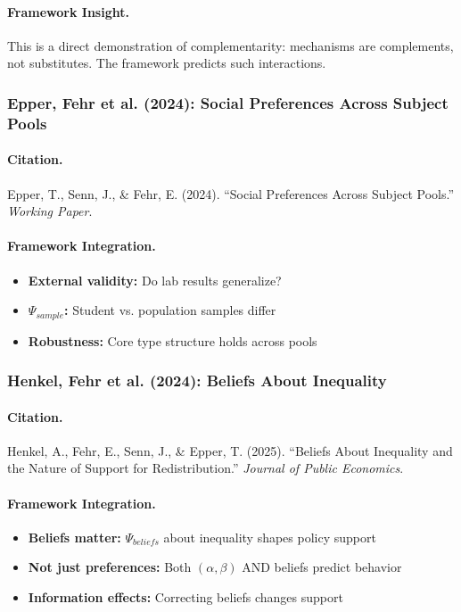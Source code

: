 \paragraph{Framework Insight.}
This is a direct demonstration of complementarity: mechanisms are
complements, not substitutes. The framework predicts such interactions.

\subsubsection{Epper, Fehr et al. (2024): Social Preferences Across Subject Pools}

\paragraph{Citation.}
Epper, T., Senn, J., \& Fehr, E. (2024). ``Social Preferences Across Subject Pools.''
\emph{Working Paper}.

\paragraph{Framework Integration.}
\begin{itemize}
  \item \textbf{External validity:} Do lab results generalize?
  \item \textbf{$\Psi_{sample}$:} Student vs. population samples differ
  \item \textbf{Robustness:} Core type structure holds across pools
\end{itemize}

\subsubsection{Henkel, Fehr et al. (2024): Beliefs About Inequality}

\paragraph{Citation.}
Henkel, A., Fehr, E., Senn, J., \& Epper, T. (2025).
``Beliefs About Inequality and the Nature of Support for Redistribution.''
\emph{Journal of Public Economics}.

\paragraph{Framework Integration.}
\begin{itemize}
  \item \textbf{Beliefs matter:} $\Psi_{beliefs}$ about inequality shapes policy support
  \item \textbf{Not just preferences:} Both $(\alpha, \beta)$ AND beliefs predict behavior
  \item \textbf{Information effects:} Correcting beliefs changes support
\end{itemize}

